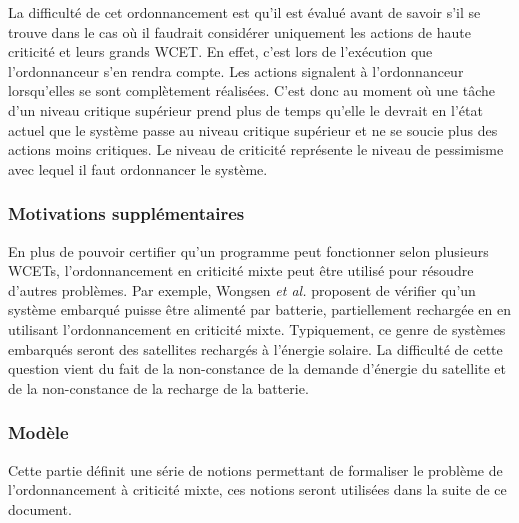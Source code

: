 \documentclass[12pt,a4paper,oneside]{book}
\theoremstyle{break}
\theoremstyle{breakplain}
\begin{document}
La difficulté de cet ordonnancement est qu'il est évalué avant de savoir s'il se trouve dans le cas où il faudrait considérer uniquement les actions de haute criticité et leurs grands WCET. En effet, c'est lors de l'exécution que l'ordonnanceur s'en rendra compte. Les actions signalent à l'ordonnanceur lorsqu'elles se sont complètement réalisées. C'est donc au moment où une tâche d'un niveau critique supérieur prend plus de temps qu'elle le devrait en l'état actuel que le système passe au niveau critique supérieur et ne se soucie plus des actions moins critiques. Le niveau de criticité représente le niveau de pessimisme avec lequel il faut ordonnancer le système. 

\subsubsection{Motivations supplémentaires}
En plus de pouvoir certifier qu'un programme peut fonctionner selon plusieurs WCETs, l'ordonnancement en criticité mixte peut être utilisé pour résoudre d'autres problèmes. Par exemple, Wongsen \textit{et al.} proposent de vérifier qu'un système embarqué puisse être alimenté par batterie, partiellement rechargée en \cite{Wognsen2014} en utilisant l'ordonnancement en criticité mixte. Typiquement, ce genre de systèmes embarqués seront des satellites rechargés à l'énergie solaire. La difficulté de cette question vient du fait de la non-constance de la demande d'énergie du satellite et de la non-constance de la recharge de la batterie.\\

\subsubsection{Modèle}
Cette partie définit une série de notions permettant de formaliser le problème de l'ordonnancement à criticité mixte, ces notions seront utilisées dans la suite de ce document.\\
\end{document}
